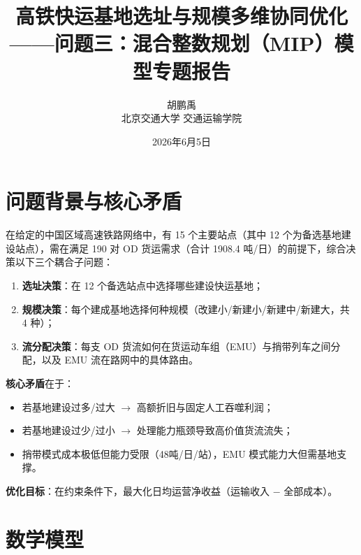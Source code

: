 \documentclass[12pt,a4paper,fontset=none]{ctexart}
\begin{document}
\title{\heiti{} 高铁快运基地选址与规模多维协同优化\\[6pt]
       \large ——问题三：混合整数规划（MIP）模型专题报告}
\author{\kaishu{} 胡鹏禹 \\[4pt] \small 北京交通大学 交通运输学院}
\date{ 2026年6月5日}
\maketitle
\thispagestyle{empty}

\section{问题背景与核心矛盾}

在给定的中国区域高速铁路网络中，有 15 个主要站点（其中 12 个为备选基地建设站点），需在满足 190 对 OD 货运需求（合计 1908.4 吨/日）的前提下，综合决策以下三个耦合子问题：

\begin{enumerate}[leftmargin=*]
    \item \textbf{选址决策}：在 12 个备选站点中选择哪些建设快运基地；
    \item \textbf{规模决策}：每个建成基地选择何种规模（改建小/新建小/新建中/新建大，共 4 种）；
    \item \textbf{流分配决策}：每支 OD 货流如何在货运动车组（EMU）与捎带列车之间分配，以及 EMU 流在路网中的具体路由。
\end{enumerate}

\textbf{核心矛盾}在于：

\begin{itemize}
    \item 若基地建设过多/过大 $\rightarrow$ 高额折旧与固定人工吞噬利润；
    \item 若基地建设过少/过小 $\rightarrow$ 处理能力瓶颈导致高价值货流流失；
    \item 捎带模式成本极低但能力受限（48吨/日/站），EMU 模式能力大但需基地支撑。
\end{itemize}

\textbf{优化目标}：在约束条件下，最大化日均运营净收益（运输收入 $-$ 全部成本）。

\section{数学模型}
\end{document}
